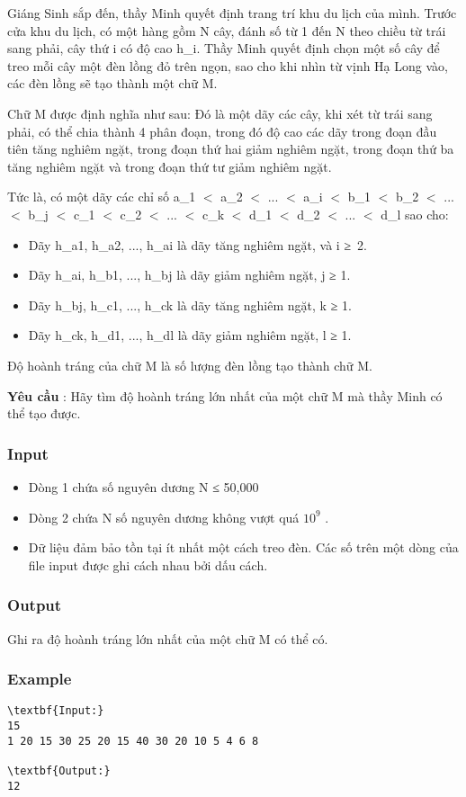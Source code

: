 



   Giáng Sinh sắp đến, thầy Minh quyết định trang trí khu du lịch của mình. Trước cửa khu du lịch, có một hàng gồm N cây, đánh số từ 1 đến N theo chiều từ trái sang phải, cây thứ i có độ cao h\_i. Thầy Minh quyết định chọn một số cây để treo mỗi cây một đèn lồng đỏ trên ngọn, sao cho khi nhìn từ vịnh Hạ Long vào, các đèn lồng sẽ tạo thành một chữ M.  

   Chữ M được định nghĩa như sau: Đó là một dãy các cây, khi xét từ trái sang phải, có thể chia thành 4 phân đoạn, trong đó độ cao các dãy trong đoạn đầu tiên tăng nghiêm ngặt, trong đoạn thứ hai giảm nghiêm ngặt, trong đoạn thứ ba tăng nghiêm ngặt và trong đoạn thứ tư giảm nghiêm ngặt.  

   Tức là, có một dãy các chỉ số a\_1 $<$ a\_2 $<$ ... $<$ a\_i $<$ b\_1 $<$ b\_2 $<$ ... $<$ b\_j $<$ c\_1 $<$ c\_2 $<$ ... $<$ c\_k $<$ d\_1 $<$ d\_2 $<$ ... $<$ d\_l sao cho:  
\begin{itemize}
	\item     Dãy h\_a1, h\_a2, ..., h\_ai là dãy tăng nghiêm ngặt, và i ≥ 2.   
	\item     Dãy h\_ai, h\_b1, ..., h\_bj là dãy giảm nghiêm ngặt, j         ≥        1.   
	\item     Dãy h\_bj, h\_c1, ..., h\_ck là dãy tăng nghiêm ngặt, k         ≥ 1.    
	\item      Dãy h\_ck, h\_d1, ..., h\_dl là dãy giảm nghiêm ngặt, l           ≥ 1.     
\end{itemize}

   Độ hoành tráng của chữ M là số lượng đèn lồng tạo thành chữ M.  

\textbf{    Yêu cầu   }   : Hãy tìm độ hoành tráng lớn nhất của một chữ M mà thầy Minh có thể tạo được.  

\subsubsection{   Input  }
\begin{itemize}
	\item     Dòng 1 chứa số nguyên dương N ≤ 50,000   
	\item     Dòng 2 chứa N số nguyên dương không vượt quá $10^{9}$    .   
	\item     Dữ liệu đảm bảo tồn tại ít nhất một cách treo đèn. Các số trên một dòng của file input được ghi cách nhau bởi dấu cách.   
\end{itemize}

\subsubsection{   Output  }

   Ghi ra độ hoành tráng lớn nhất của một chữ M có thể có.  

\subsubsection{   Example  }
\begin{verbatim}
\textbf{Input:}
15
1 20 15 30 25 20 15 40 30 20 10 5 4 6 8

\textbf{Output:}
12
\end{verbatim}
